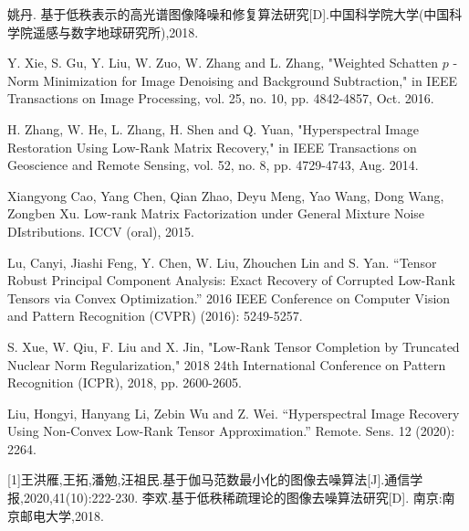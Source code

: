 \documentclass[12pt, a4paper]{article}
\begin{document}
\begin{thebibliography}{99}
姚丹. 基于低秩表示的高光谱图像降噪和修复算法研究[D].中国科学院大学(中国科学院遥感与数字地球研究所),2018.
		
Y. Xie, S. Gu, Y. Liu, W. Zuo, W. Zhang and L. Zhang, "Weighted Schatten  $p$ -Norm Minimization for Image Denoising and Background Subtraction," in IEEE Transactions on Image Processing, vol. 25, no. 10, pp. 4842-4857, Oct. 2016.%
		
H. Zhang, W. He, L. Zhang, H. Shen and Q. Yuan, "Hyperspectral Image Restoration Using Low-Rank Matrix Recovery," in IEEE Transactions on Geoscience and Remote Sensing, vol. 52, no. 8, pp. 4729-4743, Aug. 2014.%
		
Xiangyong Cao, Yang Chen, Qian Zhao, Deyu Meng, Yao Wang, Dong Wang, Zongben Xu. Low-rank Matrix Factorization under General Mixture Noise DIstributions. ICCV (oral), 2015.
		
Lu, Canyi, Jiashi Feng, Y. Chen, W. Liu, Zhouchen Lin and S. Yan. “Tensor Robust Principal Component Analysis: Exact Recovery of Corrupted Low-Rank Tensors via Convex Optimization.” 2016 IEEE Conference on Computer Vision and Pattern Recognition (CVPR) (2016): 5249-5257.
		
S. Xue, W. Qiu, F. Liu and X. Jin, "Low-Rank Tensor Completion by Truncated Nuclear Norm Regularization," 2018 24th International Conference on Pattern Recognition (ICPR), 2018, pp. 2600-2605.%
		
Liu, Hongyi, Hanyang Li, Zebin Wu and Z. Wei. “Hyperspectral Image Recovery Using Non-Convex Low-Rank Tensor Approximation.” Remote. Sens. 12 (2020): 2264.
		
[1]王洪雁,王拓,潘勉,汪祖民.基于伽马范数最小化的图像去噪算法[J].通信学报,2020,41(10):222-230.
李欢.基于低秩稀疏理论的图像去噪算法研究[D]. 南京:南京邮电大学,2018.
\end{thebibliography}
	
\newpage
\end{document}
